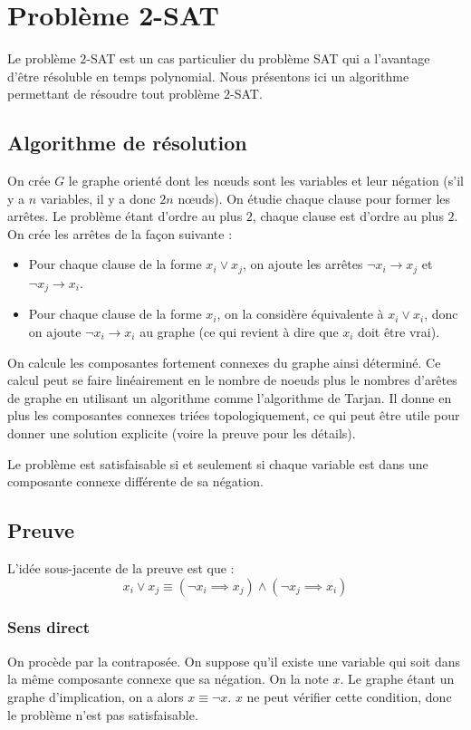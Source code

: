 \section{Problème 2-SAT}
Le problème $2$-SAT est un cas particulier du problème SAT qui a l'avantage
d'être résoluble en temps polynomial. 
Nous présentons ici un algorithme permettant de résoudre tout problème $2$-SAT.

\subsection{Algorithme de résolution}
On crée $G$ le graphe orienté dont les nœuds sont les variables et leur
négation (s'il y a $n$ variables, il y a donc $2n$ nœuds). On étudie chaque
clause pour former les arrêtes. Le problème étant d'ordre au plus $2$, chaque
clause est d'ordre au plus $2$. On crée les arrêtes de la façon suivante :
\begin{itemize}
 \item Pour chaque clause de la forme $x_i \vee x_j$, on ajoute les arrêtes
       $\neg x_i \rightarrow x_j$ et $\neg x_j \rightarrow x_i$.
 \item Pour chaque clause de la forme $x_i$, on la considère équivalente à
       $x_i \vee x_i$, donc on ajoute $\neg x_i \rightarrow x_i$ au graphe (ce
       qui revient à dire que $x_i$ doit être vrai).
\end{itemize}

On calcule les composantes fortement connexes du graphe ainsi déterminé. Ce
calcul peut se faire linéairement en le nombre de noeuds plus le nombres
d'arêtes de graphe en utilisant un algorithme comme l'algorithme de Tarjan. Il
donne en plus les composantes connexes triées topologiquement, ce qui peut être
utile pour donner une solution explicite (voire la preuve pour les détails).

Le problème est satisfaisable si et seulement si chaque variable est dans une
composante connexe différente de sa négation.

\subsection{Preuve}
L'idée sous-jacente de la preuve est que :
\[ x_i\vee x_j \equiv (\neg x_i \implies x_j) \wedge (\neg x_j \implies x_i) \]

\subsubsection{Sens direct}
On procède par la contraposée. On suppose qu'il existe une variable qui soit
dans la même composante connexe que sa négation. On la note $x$. Le graphe
étant un graphe d'implication, on a alors $x \equiv \neg x$. $x$ ne peut
vérifier cette condition, donc le problème n'est pas satisfaisable.

